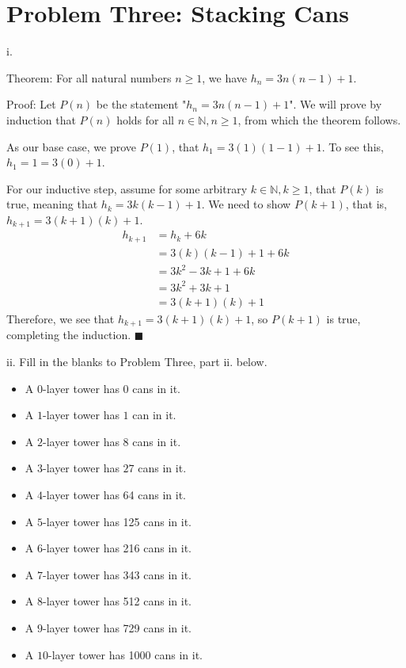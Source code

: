 \documentclass{article}
\renewcommand{\(}{\left(}
\renewcommand{\)}{\right)}
\renewcommand\qedsymbol{$\blacksquare$}
\theoremstyle{plain}
\theoremstyle{plain}
\theoremstyle{definition}
\begin{document}
\newpage

\section*{Problem Three: Stacking Cans}
    i.
    \begin{shaded}
        Theorem: For all natural numbers $n\geq1$, we have $h_{n}=3n(n-1)+1$.

        \vspace{4mm}

        Proof: Let $P(n)$ be the statement "$h_{n}=3n(n-1)+1$". We will prove by induction that $P(n)$ holds for all $n\in\mathbb{N},n\geq1$, from which the theorem follows.

        \vspace{4mm}

        As our base case, we prove $P(1)$, that $h_{1}=3(1)(1-1)+1$. To see this, $h_{1}=1=3(0)+1$.

        \vspace{4mm}

        For our inductive step, assume for some arbitrary $k\in\mathbb{N},k\geq1$, that $P(k)$ is true, meaning that $h_{k}=3k(k-1)+1$. We need to show $P(k+1)$, that is, $h_{k+1}=3(k+1)(k)+1$.
        $$
            \begin{aligned}
                h_{k+1} &= h_{k} + 6k \\
                        &= 3(k)(k-1)+1 + 6k \\
                        &= 3k^{2}-3k+1+6k \\
                        &= 3k^{2}+3k+1 \\
                        &= 3(k+1)(k)+1
            \end{aligned}
        $$
        Therefore, we see that $h_{k+1}=3(k+1)(k)+1$, so $P(k+1)$ is true, completing the induction. \qedsymbol
    \end{shaded}
    
    ii. Fill in the blanks to Problem Three, part ii. below.
    \begin{shaded}
    \begin{itemize}
     	\item A $0$-layer tower has 0 cans in it.
        \item A $1$-layer tower has $1$ can in it.
        \item A $2$-layer tower has $8$ cans in it.
        \item A $3$-layer tower has $27$ cans in it.
        \item A $4$-layer tower has 64 cans in it.
        \item A $5$-layer tower has 125 cans in it.
        \item A $6$-layer tower has 216 cans in it.
        \item A $7$-layer tower has 343 cans in it.
        \item A $8$-layer tower has 512 cans in it.
        \item A $9$-layer tower has 729 cans in it.
        \item A $10$-layer tower has 1000 cans in it.
    \end{itemize}
    \end{shaded}
    
\end{document}
